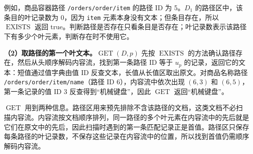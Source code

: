 \begin{algorithm}[htbp]
\caption{路径存在判断与首值提取}
\label{alg:path-reuse}
\end{algorithm}

例如，商品容器路径 \texttt{/orders/order/item} 的路径 ID 为 5。$D_1$ 的路径区中，该条目的叶记录数为 0，因为 \texttt{item} 元素本身没有文本；但条目存在，所以 $\operatorname{EXISTS}$ 返回 true。判断路径是否存在只看条目是否存在；叶记录数表示该路径下有多少个叶元素，判断存在时不使用它。

\textbf{（2）取路径的第一个叶文本。}$\operatorname{GET}(D,p)$ 先按 $\operatorname{EXISTS}$ 的方法确认路径存在，然后从头顺序解码内容流，找到第一条路径 ID 等于 $u_p$ 的记录，返回它的文本：短值通过值字典由值 ID 反查文本，长值从长值区取出原文。对商品名称路径 \texttt{/orders/order/item/name}（路径 ID 6），内容流中依次出现 $(6,3)$ 和 $(6,5)$，第一条记录的值 ID 3 反查得到“机械键盘”，因此 $\operatorname{GET}$ 返回“机械键盘”。

$\operatorname{GET}$ 用到两种信息。路径区用来预先排除不含该路径的文档，这类文档不必扫描内容流。内容流按文档顺序排列，同一路径的多个叶元素在内容流中的先后就是它们在原文中的先后，因此扫描时遇到的第一条匹配记录正是首值。路径区只保存每条路径的叶记录数，不保存这些记录在内容流中的位置，所以找到首值仍需顺序解码内容流。

